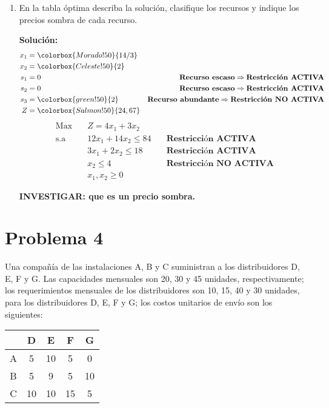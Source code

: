 \documentclass{templateNote}
\begin{document}
\begin{enumerate}
    \item En la tabla \'optima describa la soluci\'on, clasifique los recursos y indique los precios sombra de cada recurso.
    
    \textbf{Solución:}
    \begin{align*}
        x_1 &= \colorbox{Morado!50}{14/3} \\
        x_2 &= \colorbox{Celeste!50}{2} \\
        s_1 &= 0 \qquad &\textbf{Recurso escaso} \Rightarrow \textbf{Restricci\'on ACTIVA} \\
        s_2 &= 0 \qquad &\textbf{Recurso escaso} \Rightarrow \textbf{Restricci\'on ACTIVA} \\
        s_3 &= \colorbox{green!50}{2} \qquad &\textbf{Recurso abundante} \Rightarrow \textbf{Restricci\'on NO ACTIVA} \\
        Z &= \colorbox{Salmon!50}{24,67}
    \end{align*}
    \begin{equation*}
        \begin{aligned}
            \text{Max} \quad & Z = 4x_1 + 3x_2 \\
            \text{s.a} \quad & 12x_1 + 14x_2 \leq 84 \quad &\textbf{Restricci\'on ACTIVA} \\
            & 3x_1 + 2x_2 \leq 18 \quad &\textbf{Restricci\'on ACTIVA} \\
            & x_2 \leq 4 \quad &\textbf{Restricci\'on NO ACTIVA} \\
            & x_1, x_2 \geq 0
        \end{aligned}
    \end{equation*}

    \textbf{INVESTIGAR: que es un precio sombra.}
\end{enumerate}

\newpage
\section*{Problema 4}
Una compa\~n\'ia de las instalaciones A, B y C suministran a los distribuidores D, E, F y G.
Las capacidades mensuales son 20, 30 y 45 unidades, respectivamente; los requerimientos mensuales de los distribuidores son 10, 15, 40 y 30 unidades, para los distribuidores D, E, F y G; los costos unitarios de env\'io son los siguientes:
\begin{center}
    \begin{tabular}{|c|cccc|}
        \hline
        & D & E & F & G \\ \hline
        A & 5 & 10 & 5 & 0 \\
        B & 5 & 9 & 5 & 10 \\
        C & 10 & 10 & 15 & 5 \\ \hline
    \end{tabular}
\end{center}
\end{document}
